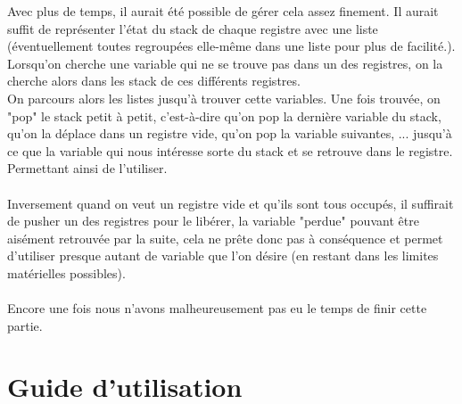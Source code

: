 \documentclass[a4paper,10pt]{article}
\begin{document}
		Avec plus de temps, il aurait été possible de gérer cela assez finement. Il aurait suffit de représenter l'état du stack de chaque registre avec une liste (éventuellement toutes regroupées elle-même dans une liste pour plus de facilité.). Lorsqu'on cherche une variable qui ne se trouve pas dans un des registres, on la cherche alors dans les stack de ces différents registres.\\
		On parcours alors les listes jusqu'à trouver cette variables. Une fois trouvée, on "pop" le stack petit à petit, c'est-à-dire qu'on pop la dernière variable du stack, qu'on la déplace dans un registre vide, qu'on pop la variable suivantes, ... jusqu'à ce que la variable qui nous intéresse sorte du stack et se retrouve dans le registre. Permettant ainsi de l'utiliser.\\
		~\\
		Inversement quand on veut un registre vide et qu'ils sont tous occupés, il suffirait de pusher un des registres pour le libérer, la variable "perdue" pouvant être aisément retrouvée par la suite, cela ne prête donc pas à conséquence et permet d'utiliser presque autant de variable que l'on désire (en restant dans les limites matérielles possibles).\\
		~\\
		Encore une fois nous n'avons malheureusement pas eu le temps de finir cette partie.
	
\section{Guide d'utilisation}
\end{document}
